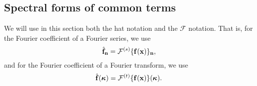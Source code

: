 \documentclass[oneside,a4paper,11pt]{article}
\begin{document}
\subsection{Spectral forms of common terms}
We will use in this section both the hat notation and the $\mathcal{F}$ notation. That is, for the Fourier coefficient of a Fourier series, we use
\begin{equation*}
\hat{\mathbf{f}}_{\mathbf{n}} = \mathcal{F}^{(s)}\{ \mathbf{f}(\mathbf{x}) \}_{\mathbf{n}},
\end{equation*}
and for the Fourier coefficient of a Fourier transform, we use
\begin{equation*}
 \hat{\mathbf{f}}(\boldsymbol\kappa) = \mathcal{F}^{(t)}\{ \mathbf{f}(\mathbf{x}) \}(\boldsymbol\kappa).
\end{equation*}
\end{document}
